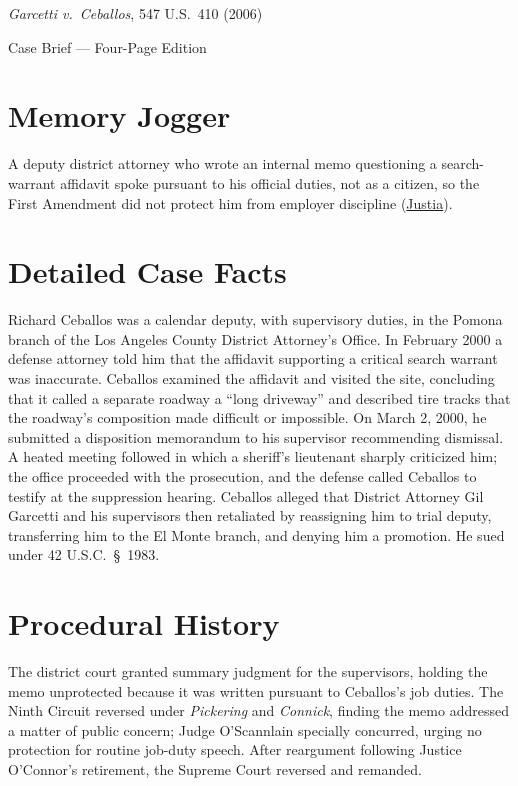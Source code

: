 \documentclass[12pt]{article}
\begin{document}
\begin{center}
{\LARGE \textit{Garcetti v.\ Ceballos}, 547 U.S.\ 410 (2006)\par}
\vspace{0.8em}
{\large Case Brief --- Four-Page Edition\par}
\end{center}
\vspace{1em}

\section{Memory Jogger}

A deputy district attorney who wrote an internal memo questioning a search-warrant affidavit spoke pursuant to his official duties, not as a citizen, so the First Amendment did not protect him from employer discipline (\href{https://supreme.justia.com/cases/federal/us/547/410/}{Justia}).

\section{Detailed Case Facts}

Richard Ceballos was a calendar deputy, with supervisory duties, in the Pomona branch of the Los Angeles County District Attorney's Office. In February 2000 a defense attorney told him that the affidavit supporting a critical search warrant was inaccurate. Ceballos examined the affidavit and visited the site, concluding that it called a separate roadway a ``long driveway'' and described tire tracks that the roadway's composition made difficult or impossible. On March 2, 2000, he submitted a disposition memorandum to his supervisor recommending dismissal. A heated meeting followed in which a sheriff's lieutenant sharply criticized him; the office proceeded with the prosecution, and the defense called Ceballos to testify at the suppression hearing. Ceballos alleged that District Attorney Gil Garcetti and his supervisors then retaliated by reassigning him to trial deputy, transferring him to the El Monte branch, and denying him a promotion. He sued under 42 U.S.C.\ \S~1983.

\section{Procedural History}

The district court granted summary judgment for the supervisors, holding the memo unprotected because it was written pursuant to Ceballos's job duties. The Ninth Circuit reversed under \textit{Pickering} and \textit{Connick}, finding the memo addressed a matter of public concern; Judge O'Scannlain specially concurred, urging no protection for routine job-duty speech. After reargument following Justice O'Connor's retirement, the Supreme Court reversed and remanded.
\end{document}
